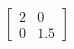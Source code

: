 \documentclass[preview]{standalone}
\begin{document}
\begin{align*}
\begin{bmatrix} 2 & 0 \\ 0 & 1.5 \end{bmatrix}
\end{align*}
\end{document}
